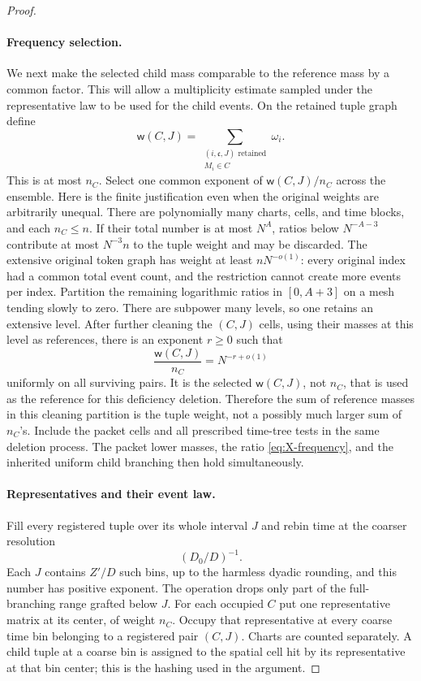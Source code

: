 \begin{proof}
\paragraph{Frequency selection.}
We next make the selected child mass comparable to the reference mass
by a common factor. This will allow a multiplicity estimate sampled
under the representative law to be used for the child events.
On the retained tuple graph define
\[
 \mathsf w(C,J)=
   \sum_{\substack{(i,\mathfrak c,J)\text{ retained}\\M_i\in C}}
         \omega_i.
\]
This is at most $n_C$. Select one common exponent of
$\mathsf w(C,J)/n_C$ across the ensemble. Here is the finite
justification even when the original weights are arbitrarily
unequal. There are polynomially many charts, cells, and time blocks,
and each $n_C\le n$. If their total number is at most $N^A$,
ratios below $N^{-A-3}$ contribute at most $N^{-3}n$ to the tuple
weight and may be discarded. The extensive original token graph has
weight at least $nN^{-o(1)}$: every original index had a common total
event count, and the restriction cannot create more events per
index. Partition the remaining logarithmic ratios in $[0,A+3]$ on
a mesh tending slowly to zero. There are subpower many levels, so
one retains an extensive level. After further cleaning the
$(C,J)$ cells, using their masses at this level as references,
there is an exponent $r\ge0$ such that
\begin{equation}
 \frac{\mathsf w(C,J)}{n_C}=N^{-r+o(1)}
\label{eq:X-frequency}
\end{equation}
uniformly on all surviving pairs. It is the selected
$\mathsf w(C,J)$, not $n_C$, that is used as the reference for this
deficiency deletion. Therefore the sum of reference masses in this
cleaning partition is the tuple weight, not a possibly much larger
sum of $n_C$'s. Include the packet cells and all prescribed time-tree
tests in the same deletion process. The packet lower masses, the
ratio \eqref{eq:X-frequency}, and the inherited uniform child
branching then hold simultaneously.

\paragraph{Representatives and their event law.}
Fill every registered tuple over its whole interval $J$ and rebin
time at the coarser resolution
\[
 (D_0/D)^{-1}.
\]
Each $J$ contains $Z'/D$ such bins, up to the harmless dyadic
rounding, and this number has positive exponent. The operation
drops only part of the full-branching range grafted below $J$.
For each occupied $C$ put one representative matrix at its center,
of weight $n_C$. Occupy that representative at every coarse time
bin belonging to a registered pair $(C,J)$. Charts are counted
separately. A child tuple at a coarse bin is assigned to the spatial
cell hit by its representative at that bin center; this is the
hashing used in the argument.


\end{proof}
